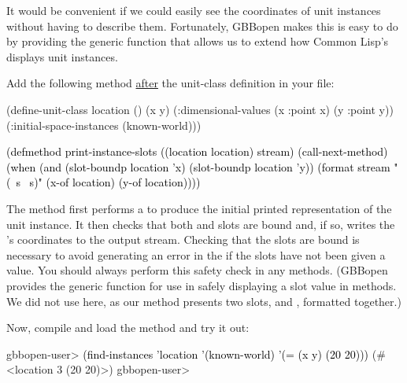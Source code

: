 \documentclass[10pt,twoside,english,pdftex]{article}
\begin{document}
%
%
It would be convenient if we could easily see the coordinates of
 unit instances without having to describe them.
Fortunately, GBBopen makes this is easy to do by providing the
 generic function that allows us to extend
how Common Lisp's  displays 
unit instances.

Add the following  method
\underline{after} the  unit-class definition in your
 file:
%
\W\supp
\begin{example}
\textcolor{darkergray}{%
  (define-unit-class location ()
    (x y)
    (:dimensional-values
      (x :point x)
      (y :point y))
    (:initial-space-instances (known-world)))

  \textcolor{black}{(defmethod print-instance-slots ((location location) stream)
    (call-next-method)
    (when (and (slot-boundp location 'x)
               (slot-boundp location 'y))
      (format stream " (~s ~s)"
              (x-of location)
              (y-of location))))}}
\end{example}
%
%
The method first performs a  to produce the
initial printed representation of the  unit instance.
It then checks that both  and  slots are bound and, if so,
writes the 's coordinates to the output stream.
Checking that the slots are bound is necessary to avoid generating an error in
the  if the slots have not been given a
value.  You should always perform this safety check in any
 methods.  (GBBopen provides the generic
function  for use in safely
displaying a slot value in  methods.  We
did not use  here, as our
 method presents two slots,  and
, formatted together.)

%
%
Now, compile and load the  method and try
it out:
%
\W\supp
\begin{example}
\textcolor{darkergray}{%
  gbbopen-user> \textcolor{black}{(find-instances 'location '(known-world)
                  '(= (x y) (20 20)))}
   (#<location 3 (20 20)>)
  gbbopen-user>}
\end{example}
\end{document}
